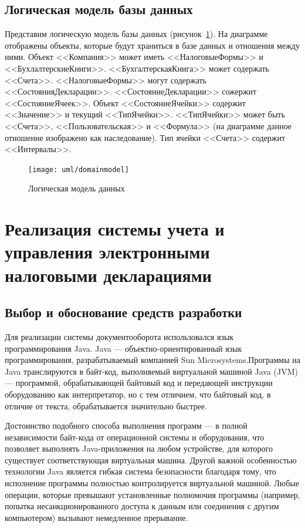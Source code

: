 \documentclass[14pt,a4paper]{reportmod}
\begin{document}
\section{Логическая модель базы данных}
Представим логическую модель базы данных (рисунок~\ref{pic:domain_model}). На диаграмме отображены объекты, которые будут храниться в базе данных и отношения между ними. Объект <<Компания>> может иметь <<НалоговыеФормы>> и <<БухлалтерскиеКниги>>. <<БухгалтерскаяКнига>> может содержать <<Счета>>. <<НалоговыеФормы>> могут содержать <<СостоянияДекларации>>. <<СостояниеДекларации>> сожержит <<СостояниеЯчеек>>. Объект <<СостояниеЯчейки>> содержит <<Значение>> и текущий <<ТипЯчейки>>. <<ТипЯчейки>> может быть <<Счета>>, <<Пользовательская>> и <<Формула>> (на диаграмме данное отношение изображено как наследование). Тип ячейки <<Счета>> содержит <<Интервалы>>.\\

\begin{figure}[ht]
  \centering
  \texttt{[image: uml/domainmodel]}
  \caption{Логическая модель данных}
  \label{pic:domain_model}
\end{figure}

\chapter{Реализация системы учета и управления электронными налоговыми декларациями}

\section{Выбор и обоснование средств разработки}
Для реализации системы документооборота использовался язык программирования Java. Java --- объектно-ориентированный язык программирования, разрабатываемый компанией Sun Microsystems.Программы на Java транслируются в байт-код, выполняемый виртуальной машиной Java (JVM) --- программой, обрабатывающей байтовый код и передающей инструкции оборудованию как интерпретатор, но с тем отличием, что байтовый код, в отличие от текста, обрабатывается значительно быстрее.


Достоинство подобного способа выполнения программ --- в полной независимости байт-кода от операционной системы и оборудования, что позволяет выполнять Java-приложения на любом устройстве, для которого существует соответствующая виртуальная машина. Другой важной особенностью технологии Java является гибкая система безопасности благодаря тому, что исполнение программы полностью контролируется виртуальной машиной. Любые операции, которые превышают установленные полномочия программы (например, попытка несанкционированного доступа к данным или соединения с другим компьютером) вызывают немедленное прерывание.
\end{document}
